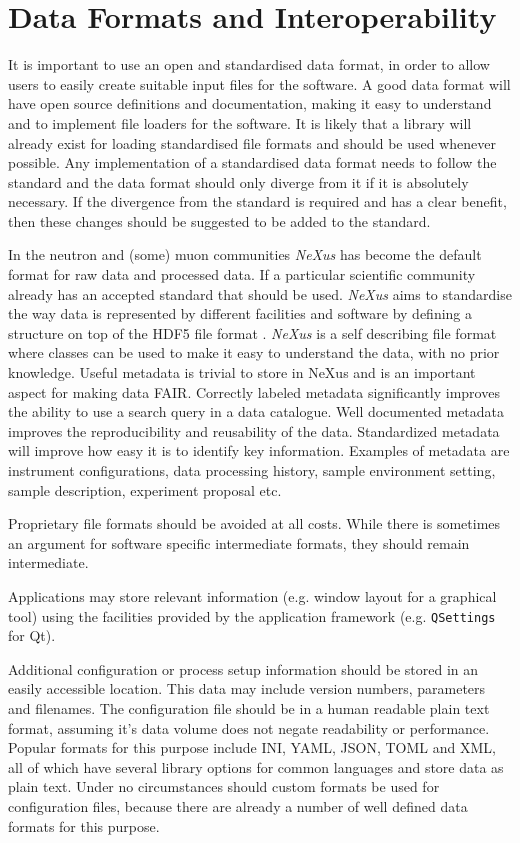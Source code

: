 \documentclass[jnr]{iosart2x}
\begin{document}
\section{Data Formats and Interoperability}
\label{Data Formats and Interoperability}

It is important to use an open and standardised data format, in order to allow users to easily create suitable input files for the software.
A good data format will have open source definitions and documentation, making it easy to understand and to implement file loaders for the software.
It is likely that a library will already exist for loading standardised file formats and should be used whenever possible.
Any implementation of a standardised data format needs to follow the standard and
the data format should only diverge from it if it is absolutely necessary.
If the divergence from the standard is required and has a clear benefit, then these changes should be suggested to be added to the standard.

In the neutron and (some) muon communities {\it NeXus} \cite{K_nnecke_2015} has become the default format for raw data and processed data.
If a particular scientific community already has an accepted standard that should be used.
{\it NeXus} aims to standardise the way data is represented by different facilities and software by defining a structure on top of the HDF5 file format \cite{HDF5}.
{\it NeXus} is a self describing file format where classes can be used to make it easy to understand the data, with no prior knowledge.
Useful metadata is trivial to store in NeXus and is an important aspect for making data FAIR.
Correctly labeled metadata significantly improves the ability to use a search query in a data catalogue.
Well documented metadata improves the reproducibility and reusability of the data.
Standardized metadata will improve how easy it is to identify key information.
Examples of metadata are instrument configurations, data processing history, sample environment setting, sample description, experiment proposal etc.

Proprietary file formats should be avoided at all costs.
While there is sometimes an argument for software specific intermediate formats, they should remain intermediate.

Applications may store relevant information (e.g. window layout for a graphical tool) using the facilities provided by the application framework (e.g. \texttt{QSettings} for Qt).

Additional configuration or process setup information should be stored in an easily accessible location.
This data may include version numbers, parameters and filenames.
The configuration file should be in a human readable plain text format, assuming it's data volume does not negate readability or performance.
Popular formats for this purpose include INI, YAML, JSON, TOML and XML, all of which have several library options for common languages and store data as plain text.
Under no circumstances should custom formats be used for configuration files, because there are already a number of well defined data formats for this purpose.
\end{document}
